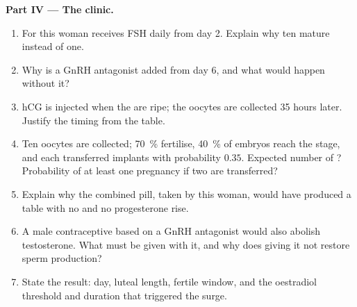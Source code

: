 \begin{problem}
\medskip
\noindent\textbf{Part IV --- The clinic.}
\begin{enumerate}[resume]
  \item For  this woman receives FSH daily
        from day 2. Explain why ten  mature instead of one.
  \item Why is a GnRH antagonist added from day 6, and what would
        happen without it?
  \item hCG is injected when the  are ripe; the oocytes are
        collected 35 hours later. Justify the timing from the table.
  \item Ten oocytes are collected; \qty{70}{\%} fertilise,
        \qty{40}{\%} of embryos reach the  stage, and each
        transferred  implants with probability $0.35$.
        Expected number of ? Probability of at least one
        pregnancy if two are transferred?
  \item Explain why the combined pill, taken by this woman, would
        have produced a table with no  and no progesterone
        rise.
  \item A male contraceptive based on a GnRH antagonist would also
        abolish testosterone. What must be given with it, and why
        does giving it not restore sperm production?
  \item State the result:  day, luteal length, fertile
        window, and the oestradiol threshold and duration that
        triggered the surge.
\end{enumerate}
\end{problem}
